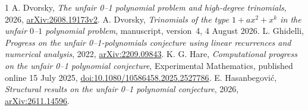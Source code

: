 \documentclass[11pt,reqno]{amsart}
\begin{document}
\begin{thebibliography}{1}
A. Dvorsky, \emph{The unfair 0--1 polynomial problem and high-degree trinomials}, 2026, \href{https://arxiv.org/abs/2608.19173v2}{arXiv:2608.19173v2}.
A. Dvorsky, \emph{Trinomials of the type $1+ax^2+x^k$ in the unfair $0$--$1$ polynomial problem}, manuscript, version~4, 4 August 2026.
L. Ghidelli, \emph{Progress on the unfair 0--1-polynomials conjecture using linear recurrences and numerical analysis}, 2022, \href{https://arxiv.org/abs/2209.09843}{arXiv:2209.09843}.
K. G. Hare, \emph{Computational progress on the unfair 0--1 polynomial conjecture}, Experimental Mathematics, published online 15 July 2025, \href{https://doi.org/10.1080/10586458.2025.2527786}{doi:10.1080/10586458.2025.2527786}.
E. Hasanbegovi\'c, \emph{Structural results on the unfair 0--1 polynomial conjecture}, 2026, \href{https://arxiv.org/abs/2611.14596}{arXiv:2611.14596}.
\end{thebibliography}
\end{document}

